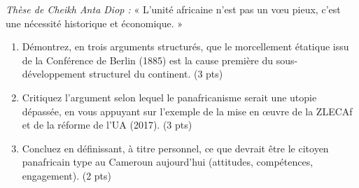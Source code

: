 \documentclass[11pt]{article}
\begin{document}
\begin{exercice}
    \textit{Thèse de Cheikh Anta Diop :} « L'unité africaine n'est pas un vœu pieux, c'est une nécessité historique et économique. »
    \begin{enumerate}
        \item Démontrez, en trois arguments structurés, que le morcellement étatique issu de la Conférence de Berlin (1885) est la cause première du sous-développement structurel du continent. (3 pts)
        \item Critiquez l'argument selon lequel le panafricanisme serait une \og utopie \fg{} dépassée, en vous appuyant sur l'exemple de la mise en œuvre de la ZLECAf et de la réforme de l'UA (2017). (3 pts)
        \item Concluez en définissant, à titre personnel, ce que devrait être le \og citoyen panafricain \fg{} type au Cameroun aujourd'hui (attitudes, compétences, engagement). (2 pts)
    \end{enumerate}
\end{exercice}
\end{document}
